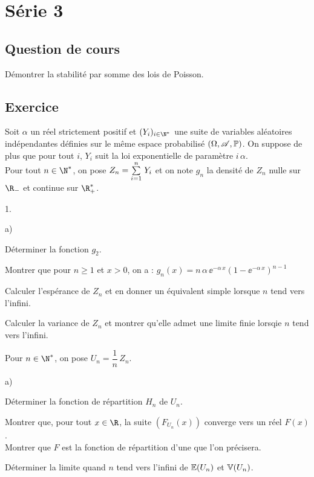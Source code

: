 \documentclass[11pt]{article}%
\begin{document}
\newpage
 
\section*{Série 3}
\subsection*{Question de cours}
\noindent
Démontrer la stabilité par somme des lois de Poisson.


\subsection*{Exercice} %
\noindent
Soit $\alpha$ un réel strictement positif et $(Y_i)_{i\in\N^*}$ une 
suite de variables aléatoires indépendantes définies sur le même espace 
probabilisé $(\Omega, \mathscr{A}, \mathbb{P})$. On suppose de plus que pour tout 
$i$, $Y_i$ suit la loi exponentielle de paramètre $i \, \alpha$.\\
Pour tout $n\in\N^*$, on pose $Z_n={\textstyle\sum\limits_{i=1}^{n}}\hspace{.1cm} Y_i$ et on note $g_n$ 
la densité de $Z_n$ nulle sur $\R_-$ et continue sur $\R_+^*$.
\begin{noliste}{1.}
 \item 
 \begin{noliste}{a)}
  \item Déterminer la fonction $g_2$.
  \item Montrer que pour $n\geq 1$ et $x>0$, on a : $g_n(x) =
  n \, \alpha \, \ee^{-\alpha \, x}\left(1-\ee^{-\alpha \, 
  x}\right)^{n-1}$
  \item Calculer l'espérance de $Z_n$ et en donner un équivalent simple 
  lorsque $n$ tend vers l'infini.
  \item Calculer la variance de $Z_n$ et montrer qu'elle admet une 
  limite finie lorsqie $n$ tend vers l'infini.
 \end{noliste}
 
 \item Pour $n\in\N^*$, on pose $U_n=\dfrac{1}{n} \, Z_n$.
 \begin{noliste}{a)}
  \item Déterminer la fonction de répartition $H_n$ de $U_n$.
  \item Montrer que, pour tout $x\in\R$, la suite $(F_{U_n}(x))$ 
  converge vers un réel $F(x)$.\\
  Montrer que $F$ est la fonction de répartition d'une \var que l'on 
  précisera.
  \item Déterminer la limite quand $n$ tend vers l'infini de $\mathbb{E}(U_n)$ 
  et $\mathbb{V}(U_n)$.
 \end{noliste}
\end{noliste}
\end{document}
